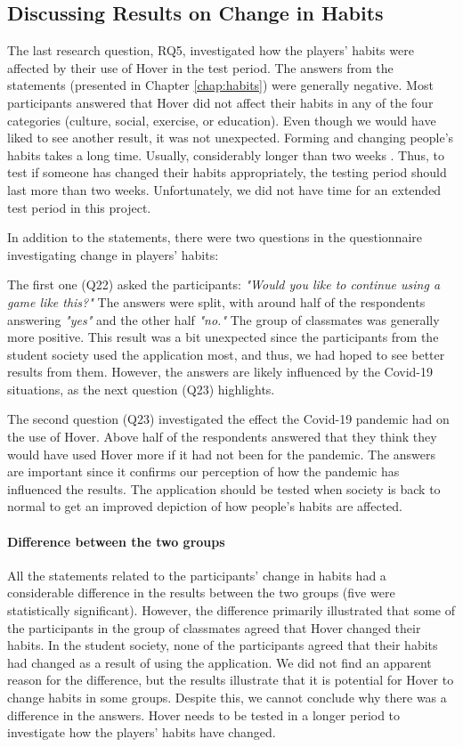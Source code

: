 \subsection{Discussing Results on Change in Habits}
The last research question, RQ5, investigated how the players’ habits were affected by their use of Hover in the test period. The answers from the statements (presented in Chapter \ref{chap:habits}) were generally negative. Most participants answered that Hover did not affect their habits in any of the four categories (culture, social, exercise, or education). Even though we would have liked to see another result, it was not unexpected. Forming and changing people’s habits takes a long time. Usually, considerably longer than two weeks \citep{lally_how_2010}. Thus, to test if someone has changed their habits appropriately, the testing period should last more than two weeks. Unfortunately, we did not have time for an extended test period in this project.

In addition to the statements, there were two questions in the questionnaire investigating change in players’ habits:

The first one (Q22) asked the participants: \textit{"Would you like to continue using a game like this?"} The answers were split, with around half of the respondents answering \textit{"yes"} and the other half \textit{"no."} The group of classmates was generally more positive. This result was a bit unexpected since the participants from the student society used the application most, and thus, we had hoped to see better results from them. However, the answers are likely influenced by the Covid-19 situations, as the next question (Q23) highlights.

The second question (Q23) investigated the effect the Covid-19 pandemic had on the use of Hover. Above half of the respondents answered that they think they would have used Hover more if it had not been for the pandemic. The answers are important since it confirms our perception of how the pandemic has influenced the results. The application should be tested when society is back to normal to get an improved depiction of how people’s habits are affected.

\paragraph*{Difference between the two groups} 
All the statements related to the participants’ change in habits had a considerable difference in the results between the two groups (five were statistically significant). However, the difference primarily illustrated that some of the participants in the group of classmates agreed that Hover changed their habits. In the student society, none of the participants agreed that their habits had changed as a result of using the application. We did not find an apparent reason for the difference, but the results illustrate that it is potential for Hover to change habits in some groups. Despite this, we cannot conclude why there was a difference in the answers. Hover needs to be tested in a longer period to investigate how the players’ habits have changed.

